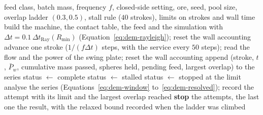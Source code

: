 \begin{algorithm}[!t]
\caption{One batch run of the laboratory jaw with the overlap ladder (\texttt{crushdem.cases.barrios2020}, \texttt{run\_case} and \texttt{run\_attempt}).}
\label{alg:dem-run}
\begin{algorithmic}[1]
\Require feed class, batch mass, frequency $f$, closed-side setting, ore, seed, pool size, overlap ladder $(0.3,0.5)$, stall rule ($40$ strokes), limits on strokes and wall time
  \State build the machine, the contact table, the feed and the simulation with $\Delta t=0.1\,\Delta t_{\mathrm{Ray}}(R_{\min})$ (Equation~\eqref{eq:dem-rayleigh}); reset the wall accounting
  \Repeat
    \State advance one stroke ($1/(f\Delta t)$ steps, with the service every $50$ steps); read the flow and the power of the swing plate; reset the wall accounting
    \State append (stroke, $t$, $\bar P_w$, cumulative mass passed, spheres held, pending feed, largest overlap) to the series
     \State status $\gets$ complete
     \State status $\gets$ stalled
     \State status $\gets$ stopped at the limit
    \EndIf
  \State analyse the series (Equations~\eqref{eq:dem-window} to~\eqref{eq:dem-resolved}); record the attempt with its limit and the largest overlap reached
   \textbf{stop} 
  \EndIf
\EndFor
\State \Return the attempts, the last one the result, with the relaxed bound recorded when the ladder was climbed
\end{algorithmic}
\end{algorithm}

